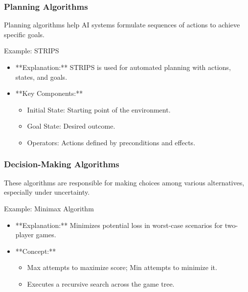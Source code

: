 \documentclass[aspectratio=169]{beamer}
\begin{document}
\begin{frame}[fragile]
    \frametitle{Planning Algorithms}
    Planning algorithms help AI systems formulate sequences of actions to achieve specific goals.

    \begin{block}{Example: STRIPS}
        \begin{itemize}
            \item **Explanation:** STRIPS is used for automated planning with actions, states, and goals.
            \item **Key Components:**
            \begin{itemize}
                \item Initial State: Starting point of the environment.
                \item Goal State: Desired outcome.
                \item Operators: Actions defined by preconditions and effects.
            \end{itemize}
        \end{itemize}
    \end{block}
\end{frame}

\begin{frame}[fragile]
    \frametitle{Decision-Making Algorithms}
    These algorithms are responsible for making choices among various alternatives, especially under uncertainty.

    \begin{block}{Example: Minimax Algorithm}
        \begin{itemize}
            \item **Explanation:** Minimizes potential loss in worst-case scenarios for two-player games.
            \item **Concept:**
            \begin{itemize}
                \item Max attempts to maximize score; Min attempts to minimize it.
                \item Executes a recursive search across the game tree.
            \end{itemize}
        \end{itemize}
    \end{block}
\end{frame}
\end{document}
